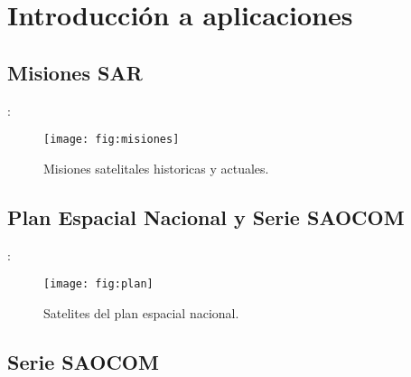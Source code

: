 \section{Introducción a aplicaciones}
\subsection{Misiones SAR}
\begin{frame}{\secname : \subsecname}
  \begin{figure}
    \centering
    \texttt{[image: fig:misiones]}
    \caption{Misiones satelitales historicas y actuales.}
    \label{}
  \end{figure}
\end{frame}

\subsection{Plan Espacial Nacional y Serie SAOCOM}
\begin{frame}{\secname : \subsecname}
  \begin{figure}
    \centering
    \texttt{[image: fig:plan]}
    \caption{Satelites del plan espacial nacional.}
    \label{}
  \end{figure}
\end{frame}
\subsection{Serie SAOCOM}

